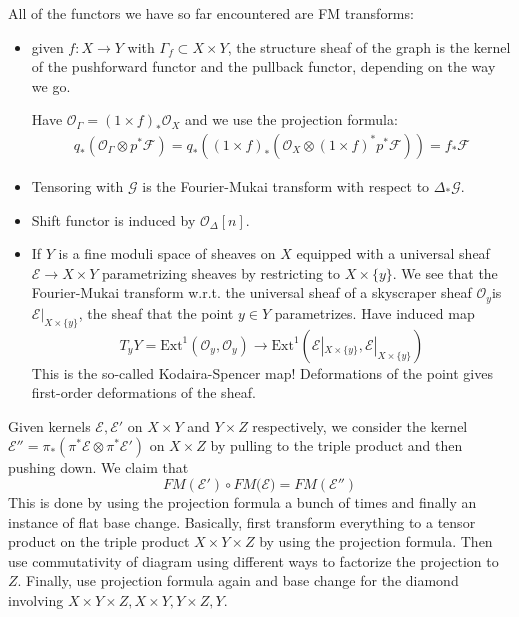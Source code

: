 All of the functors we have so far encountered are FM transforms:
\begin{itemize}
    \item  given $f:X\rightarrow Y$ with $\Gamma_f\subset X\times Y$, the structure sheaf of the graph is the kernel of the pushforward functor and the pullback functor, depending on the way we go.

    Have $\mathcal{O}_{\Gamma}=(1\times f)_{*}\mathcal{O}_{X}$ and we use the projection formula: $$\begin{gathered}
q_{*}(\mathcal{O}_{\Gamma}\otimes p^*\mathcal{F})=q_{*}((1\times f)_{*}(\mathcal{O}_{X}\otimes (1\times f)^*p^*\mathcal{F}))=f_{*}\mathcal{F}\end{gathered}$$

    \item Tensoring with $\mathcal{G}$ is the Fourier-Mukai transform with respect to $\Delta_{*}\mathcal{G}$.
    \item Shift functor is induced by $\mathcal{O}_{\Delta}[n]$.
    \item If $Y$ is a fine moduli space of sheaves on $X$ equipped with a universal sheaf $\mathcal{E}\rightarrow X\times Y$ parametrizing sheaves by restricting to $X\times \{y\}$. We see that the Fourier-Mukai transform w.r.t. the universal sheaf of a skyscraper sheaf $\mathcal{O}_{y}$is $\mathcal{E}|_{X\times \{y\}}$, the sheaf that the point $y\in Y$ parametrizes. Have induced map $$T_{y}Y=\mathrm{Ext}^1(\mathcal{O}_{y},\mathcal{O}_{y})\rightarrow \mathrm{Ext}^1(\mathcal{E}|_{X\times \{y\}},\mathcal{E}|_{X\times \{y\}})$$This is the so-called Kodaira-Spencer map! Deformations of the point gives first-order deformations of the sheaf.
\end{itemize}

Given kernels $\mathcal{E}, \mathcal{E}'$ on $X\times Y$ and $Y\times Z$ respectively, we consider the kernel $\mathcal{E}''=\pi_{*}(\pi^*\mathcal{E}\otimes \pi^*\mathcal{E}')$ on $X\times Z$ by pulling to the triple product and then pushing down. We claim that $$FM(\mathcal{E'})\circ FM(\mathcal{E)}=FM(\mathcal{E}'')$$This is done by using the projection formula a bunch of times and finally an instance of flat base change. Basically, first transform everything to a tensor product on the triple product $X\times Y \times Z$ by using the projection formula. Then use commutativity of diagram using different ways to factorize the projection to $Z$. Finally, use projection formula again and base change for the diamond involving $X\times Y \times Z, X\times Y, Y\times Z, Y$. 

